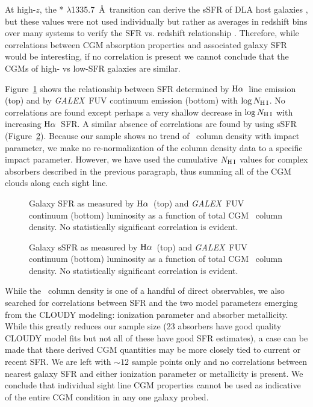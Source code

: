 \documentclass[twocolumn,twocolappendix,tighten,times]{aastex6}
\newcommand{\HI}{\ion{H}{1}}
\newcommand{\CII}{\ion{C}{2}}
\newcommand{\galex}{{\sl GALEX}}
\newcommand{\Ha}{\ensuremath{{\rm H}\alpha}}
\begin{document}
At high-$z$, the \CII* $\lambda$1335.7~\AA\ transition can derive the sSFR of DLA 
host galaxies \citep*{wolfe03a, wolfe03b}, but these values were not used 
individually but rather as averages in redshift bins over many systems to verify 
the SFR vs. redshift relationship \citep[a.k.a. the ``Madau plot'';][]
{madau96,steidel99}. Therefore, while correlations between CGM absorption 
properties and associated galaxy SFR would be interesting, if no correlation is 
present we cannot conclude that the CGMs of high- vs low-SFR galaxies are similar.

Figure~\ref{fig:sfr_HI} shows the relationship between SFR determined by \Ha\ 
line emission (top) and by \galex\ FUV continuum emission (bottom) with 
$\log{N_{\rm H\,I}}$. No correlations are found except perhaps a very shallow 
decrease in $\log{N_{\rm H\,I}}$ with increasing \Ha\ SFR. A similar absence of 
correlations are found by using sSFR (Figure~\ref{fig:ssfr_HI}). Because our 
sample shows no trend of \HI\ column density with impact parameter, we make no 
re-normalization of the column density data to a specific impact parameter. 
However, we have used the cumulative $N_{\rm H\,I}$ values for complex 
absorbers described in the previous paragraph, thus summing all of the CGM 
clouds along each sight line. 


\begin{figure}[!t]
\caption{Galaxy SFR as measured by \Ha\ (top) and \galex\ FUV continuum (bottom) luminosity as a function of total CGM \HI\ column density. No statistically significant correlation is evident.
\label{fig:sfr_HI}}
\end{figure}

\begin{figure}[!t]
\caption{Galaxy sSFR as measured by \Ha\ (top) and \galex\ FUV continuum (bottom) luminosity as a function of total CGM \HI\ column density. No statistically significant correlation is evident.
\label{fig:ssfr_HI}}
\end{figure}


While the \HI\ column density is one of a handful of direct observables, we also 
searched for correlations between SFR and the two model parameters emerging 
from the CLOUDY modeling: ionization parameter and absorber metallicity. While this 
greatly reduces our sample size (23 absorbers have good quality CLOUDY model fits 
but not all of these have good SFR estimates), a case can be made that these 
derived CGM quantities may be more closely tied to current or recent SFR. We are 
left with $\sim12$ sample points only and no correlations between nearest galaxy 
SFR and either ionization parameter or metallicity is present. We conclude that 
individual sight line CGM properties cannot be used as indicative of the entire 
CGM condition in any one galaxy probed.
\end{document}
